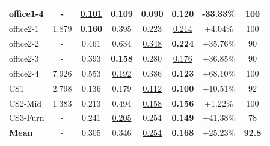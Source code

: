 \begin{table}[t!]
{\begin{tabular}{l|ccccc|c||c}
           office1-4 & -     & \underline{0.101} & 0.109 & \textbf{0.090} & 0.120 & {-33.33\%} & 100 \\
         \midrule
            office2-1 & 1.879 & \textbf{0.160} & 0.395 & 0.223 & \underline{0.214} & {+4.04\%} & 100 \\
            office2-2 & -     & 0.461 & 0.634 & \underline{0.348} & \textbf{0.224} & {+35.76\%} & 90 \\
            office2-3 & -     & 0.393 & \textbf{0.158} & 0.280 & \underline{0.176} & {+36.85\%} & 90 \\
            office2-4 & 7.926 & 0.553 & \underline{0.192} & 0.386 & \textbf{0.123} & {+68.10\%} & 100 \\
        \midrule
            CS1       & 2.798 & 0.136 & 0.179 & \underline{0.112} & \textbf{0.100} & {+10.51\%} & 92 \\
        \midrule
            CS2-Mid   & 1.383 & 0.213 & 0.494 & \underline{0.158} & \textbf{0.156} & {+1.22\%} & 100 \\
        \midrule
            CS3-Furn  & -     & 0.241 & \underline{0.205} & 0.254 & \textbf{0.149} & {+41.38\%} & 78 \\
        \midrule
             \textbf{Mean} & - & 0.305 & 0.346 & \underline{0.254} & \textbf{0.168} & {+25.23\%} & \textbf{92.8} \\
        \bottomrule
    \end{tabular}
    }
    \label{tbl_eval}
\end{table}



